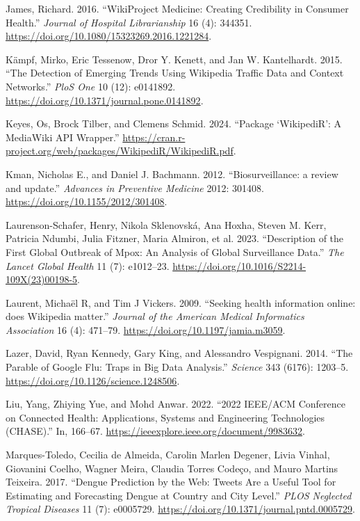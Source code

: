 \documentclass[
  12pt,
]{article}
\newlength{\cslhangindent}
\newenvironment{CSLReferences}[2] %
 {\begin{list}{}{%
  \setlength{\itemindent}{0pt}
  \setlength{\leftmargin}{0pt}
  \setlength{\parsep}{0pt}
  \ifodd #1
   \setlength{\leftmargin}{\cslhangindent}
   \setlength{\itemindent}{-1\cslhangindent}
  \fi
  \setlength{\itemsep}{#2\baselineskip}}}
 {\end{list}}
\begin{document}
\begin{CSLReferences}{1}{0}
James, Richard. 2016. {``WikiProject Medicine: Creating Credibility in
Consumer Health.''} \emph{Journal of Hospital Librarianship} 16 (4):
344351. \url{https://doi.org/10.1080/15323269.2016.1221284}.

Kämpf, Mirko, Eric Tessenow, Dror Y. Kenett, and Jan W. Kantelhardt.
2015. {``The Detection of Emerging Trends Using Wikipedia Traffic Data
and Context Networks.''} \emph{PloS One} 10 (12): e0141892.
\url{https://doi.org/10.1371/journal.pone.0141892}.

Keyes, Os, Brock Tilber, and Clemens Schmid. 2024. {``Package
{`WikipediR'}: A MediaWiki API Wrapper.''}
\url{https://cran.r-project.org/web/packages/WikipediR/WikipediR.pdf}.

Kman, Nicholas E., and Daniel J. Bachmann. 2012. {``Biosurveillance: a
review and update.''} \emph{Advances in Preventive Medicine} 2012:
301408. \url{https://doi.org/10.1155/2012/301408}.

Laurenson-Schafer, Henry, Nikola Sklenovská, Ana Hoxha, Steven M. Kerr,
Patricia Ndumbi, Julia Fitzner, Maria Almiron, et al. 2023.
{``Description of the First Global Outbreak of Mpox: An Analysis of
Global Surveillance Data.''} \emph{The Lancet Global Health} 11 (7):
e1012--23. \url{https://doi.org/10.1016/S2214-109X(23)00198-5}.

Laurent, Michaël R, and Tim J Vickers. 2009. {``Seeking health
information online: does Wikipedia matter.''} \emph{Journal of the
American Medical Informatics Association} 16 (4): 471--79.
\url{https://doi.org/10.1197/jamia.m3059}.

Lazer, David, Ryan Kennedy, Gary King, and Alessandro Vespignani. 2014.
{``The Parable of Google Flu: Traps in Big Data Analysis.''}
\emph{Science} 343 (6176): 1203--5.
\url{https://doi.org/10.1126/science.1248506}.

Liu, Yang, Zhiying Yue, and Mohd Anwar. 2022. {``2022 IEEE/ACM
Conference on Connected Health: Applications, Systems and Engineering
Technologies (CHASE).''} In, 166--67.
\url{https://ieeexplore.ieee.org/document/9983632}.

Marques-Toledo, Cecilia de Almeida, Carolin Marlen Degener, Livia
Vinhal, Giovanini Coelho, Wagner Meira, Claudia Torres Codeço, and Mauro
Martins Teixeira. 2017. {``Dengue Prediction by the Web: Tweets Are a
Useful Tool for Estimating and Forecasting Dengue at Country and City
Level.''} \emph{PLOS Neglected Tropical Diseases} 11 (7): e0005729.
\url{https://doi.org/10.1371/journal.pntd.0005729}.


\end{CSLReferences}
\end{document}
